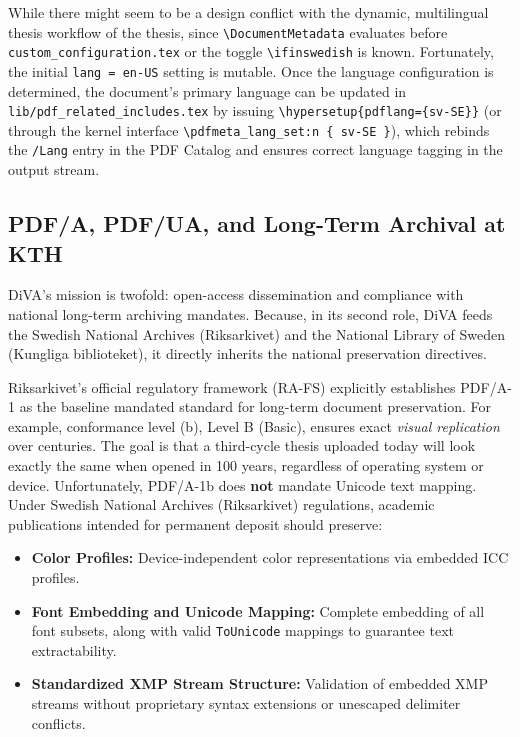 \documentclass[12pt, twoside]{article}
\newcommand{\fname}[1]{\texttt{#1}}
\begin{document}
While there might seem to be a design conflict with the dynamic, multilingual thesis workflow of the thesis, since \texttt{\textbackslash DocumentMetadata} evaluates before \fname{custom\_configuration.tex} or the toggle \texttt{\textbackslash ifinswedish} is known. Fortunately, the initial \texttt{lang = en-US} setting is mutable. Once the language configuration is determined, the document's primary language can be updated in \fname{lib/pdf\_related\_includes.tex} by issuing \texttt{\textbackslash hypersetup\{pdflang=\{sv-SE\}\}} (or through the kernel interface \texttt{\textbackslash pdfmeta\_lang\_set:n \{ sv-SE \}}), which rebinds the \texttt{/Lang} entry in the \gls{PDF} Catalog and ensures correct language tagging in the output stream.

\subsection{PDF/A, PDF/UA, and Long-Term Archival at KTH}
\label{sec:longTermArchiving}
\gls{DiVA}'s mission is twofold: open-access dissemination and compliance with national long-term archiving mandates. Because, in its second role, \gls{DiVA} feeds the Swedish National Archives (\foreignlanguage{swedish}{Riksarkivet}) and the National Library of Sweden (\foreignlanguage{swedish}{Kungliga biblioteket}), it directly inherits the national preservation directives.

Riksarkivet's official regulatory framework (RA-FS) explicitly establishes PDF/A-1 as the baseline mandated standard for long-term document preservation. For example, conformance level (b), \ie Level B (Basic), ensures exact \textit{visual replication} over centuries. The goal is that a third-cycle thesis uploaded today will look exactly the same when opened in 100 years, regardless of operating system or device. Unfortunately, PDF/A-1b does \textbf{not} mandate Unicode text mapping. Under Swedish National Archives (\foreignlanguage{swedish}{Riksarkivet}) regulations, academic publications intended for permanent deposit should preserve:
\begin{itemize}
    \item \textbf{Color Profiles:} Device-independent color representations via embedded ICC profiles.
    \item \textbf{Font Embedding and Unicode Mapping:} Complete embedding of all font subsets, along with valid \texttt{ToUnicode} mappings to guarantee text extractability.
    \item \textbf{Standardized XMP Stream Structure:} Validation of embedded \gls{XMP} streams without proprietary syntax extensions or unescaped delimiter conflicts.
\end{itemize}
\end{document}
